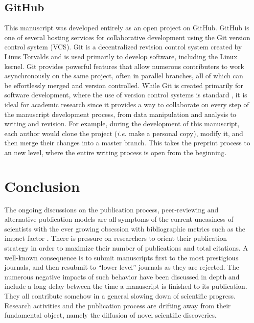 \documentclass[letterpaper,twocolumn,superscriptaddress,showkeys,longbibliography]{revtex4-1}
\begin{document}
\subsection{GitHub}

This manuscript was developed entirely as an open project on GitHub. GitHub is
one of several hosting services for collaborative development using the Git
version control system (VCS).  Git is a decentralized revision control system
created by Linus Torvalds and is used primarily to develop software, including
the Linux kernel. Git provides powerful features that allow numerous
contributers to work asynchronously on the same project, often in parallel
branches, all of which can be effortlessly merged and version controlled.  While
Git is created primarily for software development, where the use of version
control systems is standard \cite{aru12}, it is ideal for academic research
since it provides a way to collaborate on every step of the manuscript
development process, from data manipulation and analysis to writing and
revision. For example, during the development of this manuscript, each author
would clone the project (\emph{i.e.} make a personal copy), modify it, and then
merge their changes into a master branch. This takes the preprint process to an
new level, where the entire writing process is open from the beginning.

\section{Conclusion}

The ongoing discussions on the publication process, peer-reviewing and
alternative publication models are all symptoms of the current uneasiness of
scientists with the ever growing obsession with bibliographic metrics such as
the impact factor \cite{Fisher2012}. There is pressure on researchers to orient
their publication strategy in order to maximize their number of publications and
total citations. A well-known consequence is to submit manuscripts first to the
most prestigious journals, and then resubmit to ``lower level'' journals as they
are rejected. The numerous negative impacts of such behavior have been discussed
in depth \cite{hoc09} and include a long delay between the time a manuscript is
finished to its publication.  They all contribute somehow in a general slowing
down of scientific progress.  Research activities and the publication process
are drifting away from their fundamental object, namely the diffusion of novel
scientific discoveries. 
\end{document}
